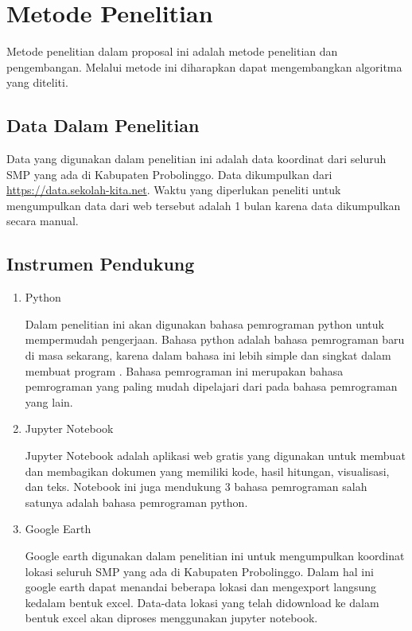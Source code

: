 \section{Metode Penelitian}

Metode penelitian dalam proposal ini adalah metode penelitian dan pengembangan. Melalui metode ini diharapkan dapat mengembangkan algoritma yang diteliti.

\subsection{Data Dalam Penelitian}
    
Data yang digunakan dalam penelitian ini adalah data koordinat dari seluruh SMP yang ada di Kabupaten Probolinggo. Data dikumpulkan dari \url{https://data.sekolah-kita.net}. Waktu yang diperlukan peneliti untuk mengumpulkan data dari web tersebut adalah 1 bulan karena data dikumpulkan secara manual.

\subsection{Instrumen Pendukung}
\begin{enumerate}
    \item Python
    
    Dalam penelitian ini akan digunakan bahasa pemrograman python untuk mempermudah pengerjaan. Bahasa python adalah bahasa pemrograman baru di masa sekarang, karena dalam bahasa ini lebih simple dan singkat dalam membuat program \cite{syahrudin2018input}. Bahasa pemrograman ini merupakan bahasa pemrograman yang paling mudah dipelajari dari pada bahasa pemrograman yang lain.
    
    \item Jupyter Notebook
    
    Jupyter Notebook adalah aplikasi web gratis yang digunakan untuk membuat dan membagikan dokumen yang memiliki kode, hasil hitungan, visualisasi, dan teks. Notebook ini juga mendukung 3 bahasa pemrograman salah satunya adalah bahasa pemrograman python.

	\item Google Earth
	
	Google earth digunakan dalam penelitian ini untuk mengumpulkan koordinat lokasi seluruh SMP yang ada di Kabupaten Probolinggo. Dalam hal ini google earth dapat menandai beberapa lokasi dan mengexport langsung kedalam bentuk excel. Data-data lokasi yang telah didownload ke dalam bentuk excel akan diproses menggunakan jupyter notebook.

\end{enumerate}

